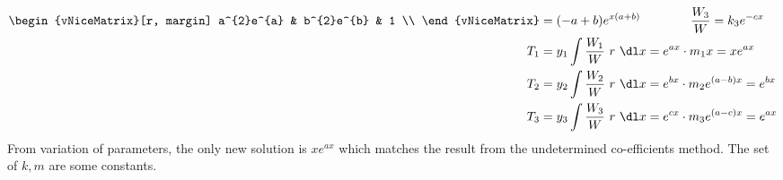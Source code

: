 \begin{enumerate}
\begin{align}
\begin{vNiceMatrix}[r, margin]
                              a^{2}e^{a} & b^{2}e^{b} & 1 \\
                          \end{vNiceMatrix}  &
              = (- a + b) e^{x(a+b)} \qquad\qquad \frac{W_3}{W} = k_3 e^{-cx}   \\
              T_1                                         &
              = y_1 \int \frac{W_1}{W}\ r\ \dl x = e^{ax} \cdot m_1 x = xe^{ax} \\
              T_2                                         &
              = y_2 \int \frac{W_2}{W}\ r\ \dl x = e^{bx} \cdot m_2 e^{(a-b)x}
              = e^{bx}                                                          \\
              T_3                                         &
              = y_3 \int \frac{W_3}{W}\ r\ \dl x = e^{cx} \cdot m_3 e^{(a-c)x}
              = e^{ax}
          \end{align}
          From variation of parameters, the only new solution is $ xe^{ax} $ which
          matches the result from the undetermined co-efficients method. The set of
          $ k, m $ are some constants.
\end{enumerate}